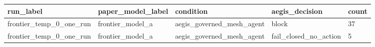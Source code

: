\begin{tabular}{lllll}
 \hline
run\_label & paper\_model\_label & condition & aegis\_decision & count \\
 \hline
frontier\_temp\_0\_one\_run & frontier\_model\_a & aegis\_governed\_mesh\_agent & block & 37 \\
frontier\_temp\_0\_one\_run & frontier\_model\_a & aegis\_governed\_mesh\_agent & fail\_closed\_no\_action & 5 \\
 \hline
\end{tabular}
